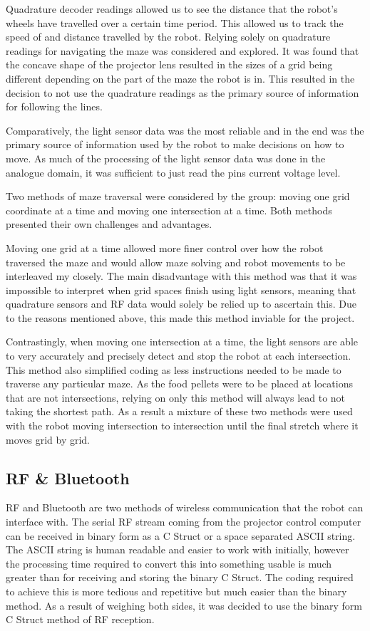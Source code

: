 \documentclass{article}
\begin{document}
Quadrature decoder readings allowed us to see the distance that the robot's wheels have travelled over a certain time period. This allowed us to track the speed of and distance travelled by the robot. Relying solely on quadrature readings for navigating the maze was considered and explored. It was found that the concave shape of the projector lens resulted in the sizes of a grid being different depending on the part of the maze the robot is in. This resulted in the decision to not use the quadrature readings as the primary source of information for following the lines.

Comparatively, the light sensor data was the most reliable and in the end was the primary source of information used by the robot to make decisions on how to move. As much of the processing of the light sensor data was done in the analogue domain, it was sufficient to just read the pins current voltage level.

Two methods of maze traversal were considered by the group: moving one grid coordinate at a time and moving one intersection at a time. Both methods presented their own challenges and advantages.

Moving one grid at a time allowed more finer control over how the robot traversed the maze and would allow maze solving and robot movements to be interleaved my closely. The main disadvantage with this method was that it was impossible to interpret when grid spaces finish using light sensors, meaning that quadrature sensors and RF data would solely be relied up to ascertain this. Due to the reasons mentioned above, this made this method inviable for the project.

Contrastingly, when moving one intersection at a time, the light sensors are able to very accurately and precisely detect and stop the robot at each intersection. This method also simplified coding as less instructions needed to be made to traverse any particular maze. As the food pellets were to be placed at locations that are not intersections, relying on only this method will always lead to not taking the shortest path. As a result a mixture of these two methods were used with the robot moving intersection to intersection until the final stretch where it moves grid by grid.

\subsection{RF \& Bluetooth}

RF and Bluetooth are two methods of wireless communication that the robot can interface with. The serial RF stream coming from the projector control computer can be received in binary form as a C Struct or a space separated ASCII string. The ASCII string is human readable and easier to work with initially, however the processing time required to convert this into something usable is much greater than for receiving and storing the binary C Struct. The coding required to achieve this is more tedious and repetitive but much easier than the binary method. As a result of weighing both sides, it was decided to use the binary form C Struct method of RF reception.
\end{document}
